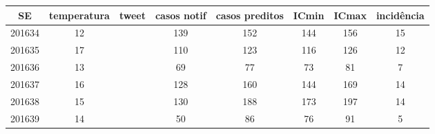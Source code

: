 \begin{tabular}{c|ccccccc}
  \hline
SE & temperatura & tweet & casos notif & casos preditos & ICmin & ICmax & incidência \\ 
  \hline
201634 & 12 &  & 139 & 152 & 144 & 156 & 15 \\ 
  201635 & 17 &  & 110 & 123 & 116 & 126 & 12 \\ 
  201636 & 13 &  & 69 & 77 & 73 & 81 & 7 \\ 
  201637 & 16 &  & 128 & 160 & 144 & 169 & 14 \\ 
  201638 & 15 &  & 130 & 188 & 173 & 197 & 14 \\ 
  201639 & 14 &  & 50 & 86 & 76 & 91 & 5 \\ 
   \hline
\end{tabular}
